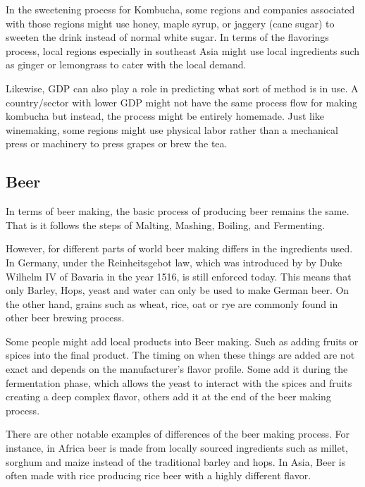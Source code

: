 \vspace{0,3cm}
In the sweetening process for Kombucha, some regions and companies associated with those regions might use honey, maple syrup, or jaggery (cane sugar) to sweeten the drink instead of normal white sugar. In terms of the flavorings process, local regions especially in southeast Asia might use local ingredients such as ginger or lemongrass to cater with the local demand. \par

\vspace{0,3cm}
Likewise, GDP can also play a role in predicting what sort of method is in use. A country/sector with lower GDP might not have the same process flow for making kombucha but instead, the process might be entirely homemade. Just like winemaking, some regions might use physical labor rather than a mechanical press or machinery to press grapes or brew the tea. \par

\vspace{0,3cm}
\subsection{Beer}
In terms of beer making, the basic process of producing beer remains the same. That is it follows the steps of Malting, Mashing, Boiling, and Fermenting. \par

\vspace{0,3cm}
However, for different parts of world beer making differs in the ingredients used. In Germany, under the Reinheitsgebot law, which was introduced by by Duke Wilhelm IV of Bavaria in the year 1516, is still enforced today. This means that only Barley, Hops, yeast and water can only be used to make German beer. On the other hand, grains such as wheat, rice, oat or rye are commonly found in other beer brewing process. \par

\vspace{0,3cm}
Some people might add local products into Beer making. Such as adding fruits or spices into the final product. The timing on when these things are added are not exact and depends on the manufacturer's flavor profile. Some add it during the fermentation phase, which allows the yeast to interact with the spices and fruits creating a deep complex flavor, others add it at the end of the beer making process. \par

\vspace{0.3cm}
There are other notable examples of differences of the beer making process. For instance, in Africa beer is made from locally sourced ingredients such as millet, sorghum and maize instead of the traditional barley and hops. In Asia, Beer is often made with rice producing rice beer with a highly different flavor. 

